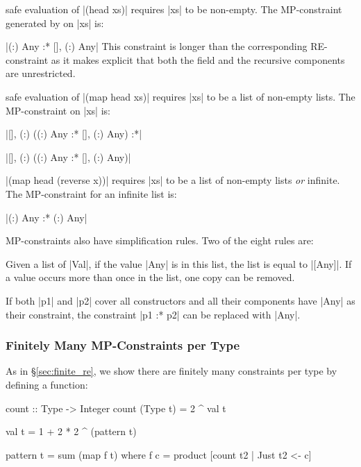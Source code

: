 \begin{revisit}{1} safe evaluation of |(head xs)| requires |xs| to be non-empty. The MP-constraint generated by \catch{} on |xs| is: \ignore|{(:) Any} :* {[], (:) Any}| This constraint is longer than the corresponding RE-constraint as it makes explicit that both the  field and the recursive components are unrestricted.
\end{revisit}

\begin{revisit}{2} safe evaluation of |(map head xs)| requires |xs| to be a list of non-empty lists. The MP-constraint on |xs| is:

\smallskip
\par\noindent \ignore|{[], (:) ({(:) Any} :* {[], (:) Any})} :*|
\par\noindent \ignore|{[], (:) ({(:) Any} :* {[], (:) Any})}|
\end{revisit}

\begin{revisit}{3} |(map head (reverse x))| requires |xs| to be a list of non-empty lists \textit{or} infinite. The MP-constraint for an infinite list is: \ignore|{(:) Any} :* {(:) Any}|
\end{revisit}

MP-constraints also have simplification rules.  Two of the eight rules are:

 Given a list of |Val|, if the value |Any| is in this list, the list is equal to |[Any]|. If a value occurs more than once in the list, one copy can be removed.

 If both |p1| and |p2| cover all constructors and all their components have |Any| as their constraint, the constraint |p1 :* p2| can be replaced with |Any|.


\subsubsection{Finitely Many MP-Constraints per Type}

As in \S\ref{sec:finite_re}, we show there are finitely many constraints per type by defining a  function:

\begin{code}
count :: Type -> Integer
count (Type t) = 2 ^ val t

val t = 1 + 2 * 2 ^ (pattern t)

pattern t = sum (map f t)
    where f c = product [count t2 | Just t2 <- c]
\end{code}

